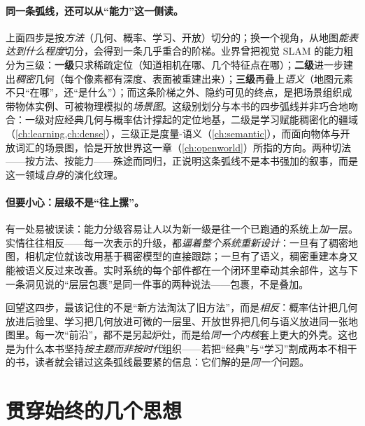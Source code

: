 \paragraph{同一条弧线，还可以从“能力”这一侧读。}
上面四步是按\emph{方法}（几何、概率、学习、开放）切分的；换一个视角，从地图\emph{能表达到什么程度}切分，会得到一条几乎重合的阶梯。业界曾把视觉 SLAM 的能力粗分为三级\cite{davison2026computational}：\textbf{一级}只求稀疏定位（知道相机在哪、几个特征点在哪）；\textbf{二级}进一步建出\emph{稠密}几何（每个像素都有深度、表面被重建出来）；\textbf{三级}再叠上\emph{语义}（地图元素不只“在哪”，还“是什么”）；而这条阶梯之外、隐约可见的终点，是把场景组织成带物体实例、可被物理模拟的\emph{场景图}。这级别划分与本书的四步弧线并非巧合地吻合：一级对应经典几何与概率估计撑起的定位地基，二级是学习赋能稠密化的疆域（\cref{ch:learning,ch:dense}），三级正是度量-语义（\cref{ch:semantic}），而面向物体与开放词汇的场景图，恰是开放世界这一章（\cref{ch:openworld}）所指的方向。两种切法——按方法、按能力——殊途而同归，正说明这条弧线不是本书强加的叙事，而是这一领域\emph{自身}的演化纹理。

\paragraph{但要小心：层级不是“往上摞”。}
有一处易被误读：能力分级容易让人以为新一级是往一个已跑通的系统上\emph{加}一层。实情往往相反\cite{davison2026computational}——每一次表示的升级，都\emph{逼着整个系统重新设计}：一旦有了稠密地图，相机定位就该改用基于稠密模型的直接跟踪；一旦有了语义，稠密重建本身又能被语义反过来改善。实时系统的每个部件都在一个闭环里牵动其余部件，这与下一条洞见说的“层层包裹”是同一件事的两种说法——包裹，不是叠加。

\begin{insight}
回望这四步，最该记住的不是“新方法淘汰了旧方法”，而是\emph{相反}：概率估计把几何放进后验里、学习把几何放进可微的一层里、开放世界把几何与语义放进同一张地图里。每一次“前沿”，都不是另起炉灶，而是给\emph{同一个内核}套上更大的外壳。这也是为什么本书坚持\emph{按主题而非按时代}组织——若把“经典”与“学习”割成两本不相干的书，读者就会错过这条弧线最要紧的信息：它们解的是\emph{同一个}问题。
\end{insight}

\section{贯穿始终的几个思想}
\label{sec:epilogue-threads}

